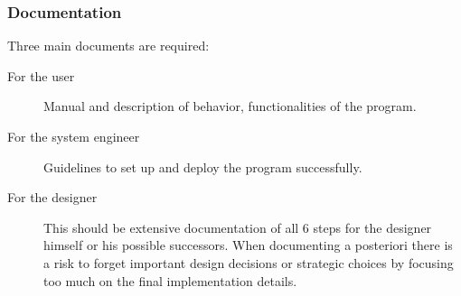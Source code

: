 \subsubsection{Documentation}
Three main  documents are required:
\begin{description}
	\item[For the user] Manual and description of behavior, functionalities of the program.
	\item[For the system engineer] Guidelines to set up and deploy the program successfully. 
	\item[For the designer] This should be extensive documentation of all 6 steps for the designer himself or his possible successors. When documenting a posteriori there is a risk to forget important design decisions or strategic choices by focusing too much on the final implementation details. 
\end{description}

